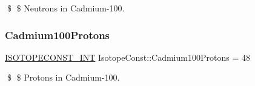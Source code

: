 \$ \$ Neutrons in Cadmium-\/100. \mbox{\label{group___isotope_const-_cadmium-_cd100_gaec461b40ee532d2e0677c6569dcc3e53}} 
\subsubsection{\texorpdfstring{Cadmium100\+Protons}{Cadmium100Protons}}
{\footnotesize\ttfamily \mbox{\hyperlink{group___isotope_const-_macros_ga5f18360b3e99483a35c32d789e62621c}{I\+S\+O\+T\+O\+P\+E\+C\+O\+N\+S\+T\+\_\+\+I\+NT}} Isotope\+Const\+::\+Cadmium100\+Protons = 48}

\$ \$ Protons in Cadmium-\/100. 